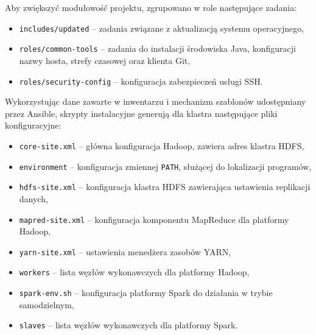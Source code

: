 Aby zwiększyć modułowość projektu, zgrupowano w role następujące zadania:
\begin{itemize}
	\item \lstinline{includes/updated} -- zadania związane z aktualizacją systemu operacyjnego,
	\item \lstinline{roles/common-tools} -- zadania do instalacji środowiska Java, konfiguracji
	      nazwy hosta, strefy czasowej oraz klienta Git,
	\item \lstinline{roles/security-config} -- konfiguracja zabezpieczeń usługi SSH.
\end{itemize}

Wykorzystując dane zawarte w inwentarzu i mechanizm szablonów udostępniany przez Ansible, skrypty
instalacyjne generują dla klastra następujące pliki konfiguracyjne:
\begin{itemize}
	\item \lstinline{core-site.xml} -- główna konfiguracja Hadoop, zawiera adres klastra HDFS,
	\item \lstinline{environment} -- konfiguracja zmiennej \lstinline{PATH}, służącej do lokalizacji programów,
	\item \lstinline{hdfs-site.xml} -- konfiguracja klastra HDFS zawierająca ustawienia replikacji danych,
	\item \lstinline{mapred-site.xml} -- konfiguracja komponentu MapReduce dla platformy Hadoop,
	\item \lstinline{yarn-site.xml} -- ustawienia menedżera zasobów YARN,
	\item \lstinline{workers} -- lista węzłów wykonawczych dla platformy Hadoop,
	\item \lstinline{spark-env.sh} -- konfiguracja platformy Spark do działania w trybie samodzielnym,
	\item \lstinline{slaves} -- lista węzłów wykonawczych dla platformy Spark.
\end{itemize}

